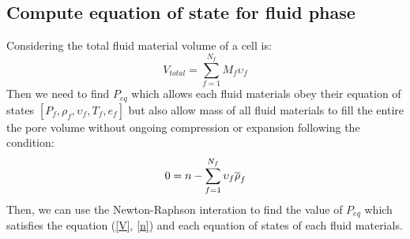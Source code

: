 \documentclass[preprint,12pt]{elsarticle}
\begin{document}
\subsection{\textsf{Compute equation of state for fluid phase}}
Considering the total fluid material volume of a cell is:
%
%
\begin{equation}
\label{V}
    V_{total} = \sum_{f=1}^{N_f} M_f \upsilon_f 
\end {equation}
%
%
Then we need to find $P_{eq}$ which allows each fluid materials obey their equation of states $[P_f, \rho_f, \upsilon_f, T_f, e_f]$ but also allow mass of all fluid materials to fill the entire the pore volume without ongoing compression or expansion following the condition:
%
%
\begin{equation}
    0 = n - \sum_{f=1}^{N_f} \upsilon_f \overline{\rho}_f\\
\label{n}
\end {equation}
%
%
Then, we can use the Newton-Raphson interation to find the value of $P_{eq}$ which satisfies the equation (\ref{V}, \ref{n}) and each equation of states of each fluid materials.
\end{document}
